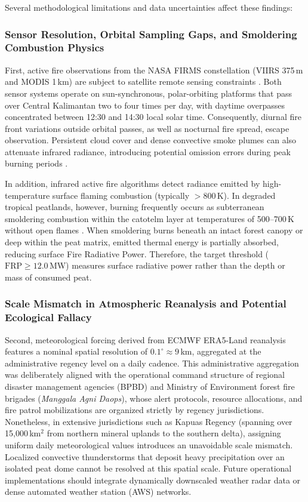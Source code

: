 Several methodological limitations and data uncertainties affect these findings:

\subsubsection{Sensor Resolution, Orbital Sampling Gaps, and Smoldering Combustion Physics}
First, active fire observations from the NASA FIRMS constellation (VIIRS 375\,m and MODIS 1\,km) are subject to satellite remote sensing constraints \citep{Schroeder2021RSE, Giglio2020RSE}. Both sensor systems operate on sun-synchronous, polar-orbiting platforms that pass over Central Kalimantan two to four times per day, with daytime overpasses concentrated between 12:30 and 14:30 local solar time. Consequently, diurnal fire front variations outside orbital passes, as well as nocturnal fire spread, escape observation. Persistent cloud cover and dense convective smoke plumes can also attenuate infrared radiance, introducing potential omission errors during peak burning periods \citep{Giglio2020RSE}.

In addition, infrared active fire algorithms detect radiance emitted by high-temperature surface flaming combustion (typically $>800$\,K). In degraded tropical peatlands, however, burning frequently occurs as subterranean smoldering combustion within the catotelm layer at temperatures of 500--700\,K without open flames \citep{Usup2004Tropics, Wooster2018NatGeosci, Vetrita2020RemoteSensing}. When smoldering burns beneath an intact forest canopy or deep within the peat matrix, emitted thermal energy is partially absorbed, reducing surface Fire Radiative Power. Therefore, the target threshold ($\text{FRP} \ge 12.0$\,MW) measures surface radiative power rather than the depth or mass of consumed peat.

\subsubsection{Scale Mismatch in Atmospheric Reanalysis and Potential Ecological Fallacy}
Second, meteorological forcing derived from ECMWF ERA5-Land reanalysis features a nominal spatial resolution of $0.1^\circ \approx 9$\,km, aggregated at the administrative regency level on a daily cadence. This administrative aggregation was deliberately aligned with the operational command structure of regional disaster management agencies (BPBD) and Ministry of Environment forest fire brigades (\textit{Manggala Agni Daops}), whose alert protocols, resource allocations, and fire patrol mobilizations are organized strictly by regency jurisdictions. Nonetheless, in extensive jurisdictions such as Kapuas Regency (spanning over 15,000\,km$^2$ from northern mineral uplands to the southern delta), assigning uniform daily meteorological values introduces an unavoidable scale mismatch. Localized convective thunderstorms that deposit heavy precipitation over an isolated peat dome cannot be resolved at this spatial scale. Future operational implementations should integrate dynamically downscaled weather radar data or dense automated weather station (AWS) networks.

